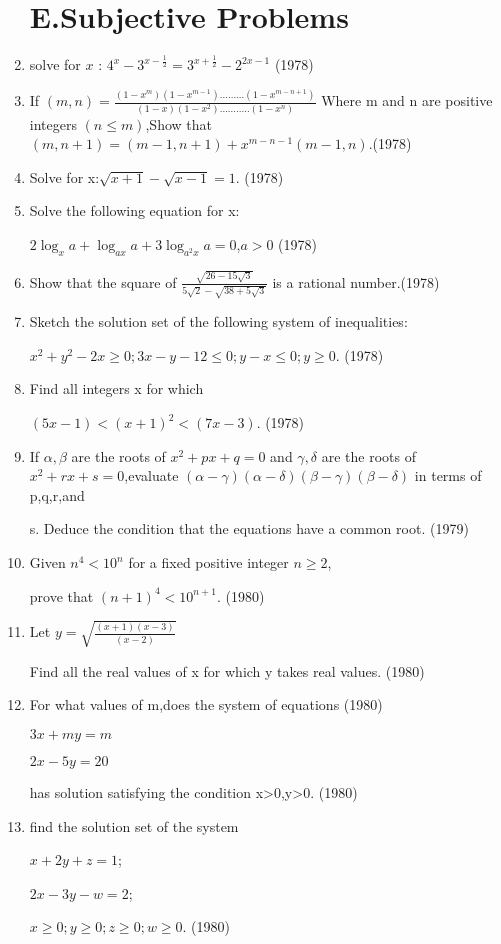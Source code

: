 \documentclass[journal,12pt,twocolumn]{IEEEtran}
\theoremstyle{remark}
\begin{document}
\begin{enumerate}
\section{E.Subjective Problems}
 
 \item solve for $x$ : $4^x-3^{x-\frac{1}{2}}=3^{x+\frac{1}{2}}-2^{2x-1}$                       \hfill  (1978)

 
 \item If $(m,n)=\frac{(1-x^m)(1-x^{m-1}).........(1-x^{m-n+1})}{(1-x)(1-x^2)...........(1-x^n)}$ Where m and n are positive integers $(n\leq m)$,Show that $(m,n+1)=(m-1,n+1)+x^{m-n-1}(m-1,n)$.(1978)
 \item Solve for x:$\sqrt{x+1}-\sqrt{x-1}=1$.   \hfill (1978)
 \item Solve the following equation for x:
 
$2\log_x a+\log_{ax} a+3\log_{a^2x} a=0$,$a>0$ \hfill (1978)
\item Show that the square of $\frac{\sqrt{26-15\sqrt{3}}}{5\sqrt{2}-\sqrt{38+5\sqrt{3}}}$ is a rational number.\hfill (1978) 
\item Sketch the solution set of the following system of inequalities:

$x^2+y^2-2x\geq 0;3x-y-12\leq 0;y-x\leq 0;y\geq 0$. \hfill (1978)
\item Find all integers x for which

$(5x-1)<(x+1)^2<(7x-3)$. \hfill (1978)
\item If $\alpha,\beta$ are the roots of $x^2+px+q=0$ and $\gamma,\delta$ are the roots of $x^2+rx+s=0$,evaluate $(\alpha-\gamma)(\alpha-\delta)(\beta-\gamma)(\beta-\delta)$ in terms of p,q,r,and 

s. Deduce the condition that the equations have a common root. \hfill (1979)
\item Given $n^4<10^n$ for a fixed positive integer $n\geq 2$,

prove that $(n+1)^4<10^{n+1}$. \hfill (1980)
\item Let $y=\sqrt{\frac{(x+1)(x-3)}{(x-2)}}$

Find all the real values of x for which y takes real values. \hfill (1980)
\item For what values of m,does the system of equations \hfill (1980)

$3x+my=m$

$2x-5y=20$

has solution satisfying the condition x>0,y>0. \hfill (1980)
\item find the solution set of the system

$x+2y+z=1$;

$2x-3y-w=2$;

$x\geq 0;y\geq 0;z\geq 0;w\geq 0$.  \hfill (1980)
 \end{enumerate}

 
\end{document}
